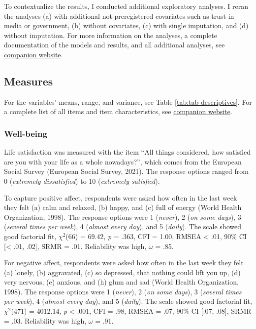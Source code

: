 \documentclass[
  man,mask,floatsintext]{apa7}
\begin{document}
To contextualize the results, I conducted additional exploratory analyses.
I reran the analyses (a) with additional not-preregistered covariates such as trust in media or government, (b) without covariates, (c) with single imputation, and (d) without imputation.
For more information on the analyses, a complete documentation of the models and results, and all additional analyses, see \href{https://XMtRA.github.io/Austrian_Corona_Panel_Project}{companion website}.

\hypertarget{measures}{%
\subsection{Measures}\label{measures}}

For the variables' means, range, and variance, see Table \ref{tab:tab-descriptives}.
For a complete list of all items and item characteristics, see \href{https://XMtRA.github.io/Austrian_Corona_Panel_Project}{companion website}.

\hypertarget{well-being}{%
\subsubsection{Well-being}\label{well-being}}

Life satisfaction was measured with the item ``All things considered, how satisfied are you with your life as a whole nowadays?'', which comes from the European Social Survey (European Social Survey, 2021).
The response options ranged from 0 (\emph{extremely dissatisfied}) to 10 (\emph{extremely satisfied}).

To capture positive affect, respondents were asked how often in the last week they felt (a) calm and relaxed, (b) happy, and (c) full of energy (World Health Organization, 1998).
The response options were 1 (\emph{never}), 2 (\emph{on some days}), 3 (\emph{several times per week}), 4 (\emph{almost every day}), and 5 (\emph{daily}).
The scale showed good factorial fit, \(\chi^2\)(66) = 69.42, \emph{p} = .363, CFI = 1.00, RMSEA \textless{} .01, 90\% CI {[}\textless{} .01, .02{]}, SRMR = .01.
Reliability was high, \(\omega\) = .85.

For negative affect, respondents were asked how often in the last week they felt (a) lonely, (b) aggravated, (c) so depressed, that nothing could lift you up, (d) very nervous, (e) anxious, and (h) glum and sad (World Health Organization, 1998).
The response options were 1 (\emph{never}), 2 (\emph{on some days}), 3 (\emph{several times per week}), 4 (\emph{almost every day}), and 5 (\emph{daily}).
The scale showed good factorial fit, \(\chi^2\)(471) = 4012.14, \emph{p} \textless{} .001, CFI = .98, RMSEA = .07, 90\% CI {[}.07, .08{]}, SRMR = .03.
Reliability was high, \(\omega\) = .91.
\end{document}
